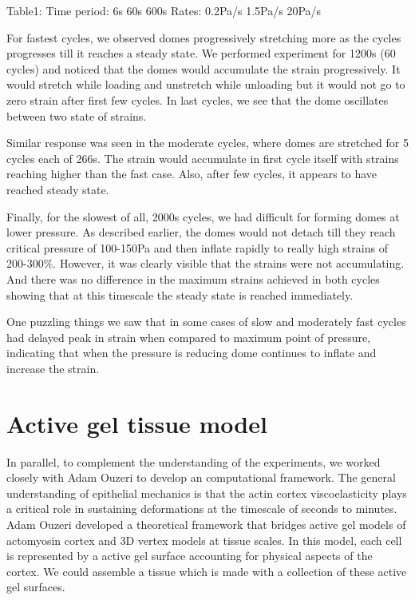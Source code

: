 Table1: Time period: 6s 60s 600s Rates: 0.2Pa/s 1.5Pa/s 20Pa/s

For fastest cycles, we observed domes progressively stretching more as
the cycles progresses till it reaches a steady state. We performed
experiment for 1200s (60 cycles) and noticed that the domes would
accumulate the strain progressively. It would stretch while loading and
unstretch while unloading but it would not go to zero strain after first
few cycles. In last cycles, we see that the dome oscillates between two
state of strains.

Similar response was seen in the moderate cycles, where domes are
stretched for 5 cycles each of 266s. The strain would accumulate in
first cycle itself with strains reaching higher than the fast case.
Also, after few cycles, it appears to have reached steady state.

Finally, for the slowest of all, 2000s cycles, we had difficult for
forming domes at lower pressure. As described earlier, the domes would
not detach till they reach critical pressure of 100-150Pa and then
inflate rapidly to really high strains of 200-300\%. However, it was
clearly visible that the strains were not accumulating. And there was no
difference in the maximum strains achieved in both cycles showing that
at this timescale the steady state is reached immediately.

One puzzling things we saw that in some cases of slow and moderately
fast cycles had delayed peak in strain when compared to maximum point of
pressure, indicating that when the pressure is reducing dome continues
to inflate and increase the strain.

\hypertarget{active-gel-tissue-model}{%
\section{Active gel tissue model}\label{active-gel-tissue-model}}

In parallel, to complement the understanding of the experiments, we
worked closely with Adam Ouzeri to develop an computational framework.
The general understanding of epithelial mechanics is that the actin
cortex viscoelasticity plays a critical role in sustaining deformations
at the timescale of seconds to minutes. Adam Ouzeri developed a
theoretical framework that bridges active gel models of actomyosin
cortex and 3D vertex models at tissue scales. In this model, each cell
is represented by a active gel surface accounting for physical aspects
of the cortex. We could assemble a tissue which is made with a
collection of these active gel surfaces.

